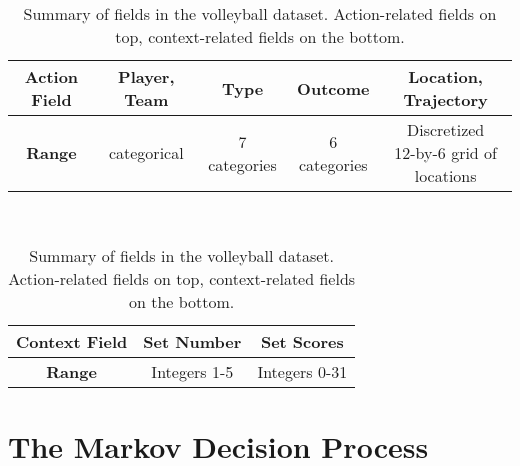 \documentclass{sfuthesis}
\begin{document}
	\begin{table}[ht]
		\centering
		\begin{tabular}{c|c|c|c|c}
			\textbf{Action Field} & \textbf{Player, Team} & \textbf{Type} & \textbf{Outcome} & \textbf{Location, Trajectory}         \\ \hline
			\textbf{Range} & categorical           & 7 categories  & 6 categories     & \makecell[c]{Discretized\\ 12-by-6 grid of locations}
		\end{tabular}
		\\ \vspace{0.75cm}
		\begin{tabular}{c|c|c}
			\textbf{Context Field} & \textbf{Set Number} & \textbf{Set Scores}    \\ \hline
			\textbf{Range} & Integers 1-5        & Integers 0-31
		\end{tabular}
		\caption{Summary of fields in the volleyball dataset. Action-related fields on top, context-related fields on the bottom.}
		\label{tab:data-fields}
	\end{table}

	\section{The Markov Decision Process}
	\label{section-mdp}
	
\end{document}
